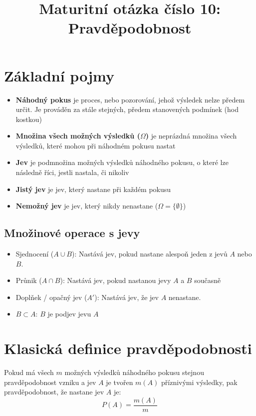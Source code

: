 \documentclass[12pt]{article}
\title{Maturitní otázka číslo 10: Pravděpodobnost}
\author{}
\date{}
\begin{document}
\maketitle

\section*{Základní pojmy}

\begin{itemize}[itemsep = 2pt]
    \item \textbf{Náhodný pokus} je proces, nebo pozorování, jehož výsledek nelze předem určit. Je prováděn
    za stále stejných, předem stanovených podmínek (hod kostkou)
    \item \textbf{Množina všech možných výsledků ($\Omega$)} je neprázdná množina všech výsledků, které mohou při náhodném pokusu nastat
    \item \textbf{Jev} je podmnožina možných výsledků náhodného pokusu, o které lze následně říci, jestli nastala, či nikoliv
    \item \textbf{Jistý jev} je jev, který nastane při každém pokusu
    \item \textbf{Nemožný jev} je jev, který nikdy nenastane ($\Omega = \{\emptyset\}$)
\end{itemize}

\subsection*{Množinové operace s jevy}
\begin{itemize}[itemsep = 2pt]
    \item Sjednocení ($A \cup B$): Nastává jev, pokud nastane alespoň jeden z jevů  $A$ nebo $B$.
    \item Průnik ($A \cap B$): Nastává jev, pokud nastanou jevy $A$ a $B$ současně
    \item Doplňek / opačný jev ($A'$): Nastává jev, že jev $A$ nenastane.
    \item $B \subset A$: $B$ je podjev jevu $A$ 
\end{itemize}

\section*{Klasická definice pravděpodobnosti}
Pokud má všech $m$ možných výsledků náhodného pokusu stejnou pravděpodobnost vzniku a jev $A$ je tvořen $m(A)$ příznivými výsledky, pak  pravděpodobnost, že nastane jev $A$ je: 
\[P(A) = \frac{m(A)}{m}\]
\end{document}
